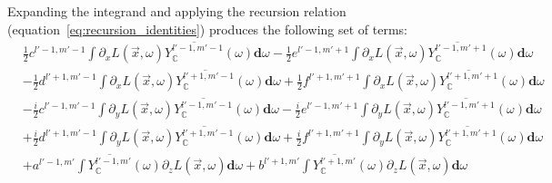 \documentclass[10pt]{scrartcl}
\begin{document}
Expanding the integrand and applying the recursion relation (equation~\ref{eq:recursion_identities}) produces the following set of terms:
\begin{align*}
&
\frac{1}{2}c^{{l'-1,m'-1}}\int{\partial_xL\left (\vec{x} ,\omega \right )\overline{Y_{\mathbb{C}}^{l'-1, m'-1}}(\omega )\mathbf{d}\omega}
-\frac{1}{2}e^{{l'-1,m'+1}}\int{\partial_xL\left (\vec{x} ,\omega \right )\overline{Y_{\mathbb{C}}^{l'-1, m'+1}}(\omega )\mathbf{d}\omega}
\\&
-\frac{1}{2}d^{{l'+1,m'-1}}\int{\partial_xL\left (\vec{x} ,\omega \right )\overline{Y_{\mathbb{C}}^{l'+1, m'-1}}(\omega )\mathbf{d}\omega}
+\frac{1}{2}f^{{l'+1,m'+1}}\int{\partial_xL\left (\vec{x} ,\omega \right )\overline{Y_{\mathbb{C}}^{l'+1, m'+1}}(\omega )\mathbf{d}\omega}
\\&
-\frac{i}{2}c^{{l'-1,m'-1}}\int{\partial_yL\left (\vec{x} ,\omega \right )\overline{Y_{\mathbb{C}}^{l'-1, m'-1}}(\omega )\mathbf{d}\omega}
-\frac{i}{2}e^{{l'-1,m'+1}}\int{\partial_yL\left (\vec{x} ,\omega \right )\overline{Y_{\mathbb{C}}^{l'-1, m'+1}}(\omega )\mathbf{d}\omega}
\\&
+\frac{i}{2}d^{{l'+1,m'-1}}\int{\partial_yL\left (\vec{x} ,\omega \right )\overline{Y_{\mathbb{C}}^{l'+1, m'-1}}(\omega )\mathbf{d}\omega}
+\frac{i}{2}f^{{l'+1,m'+1}}\int{\partial_yL\left (\vec{x} ,\omega \right )\overline{Y_{\mathbb{C}}^{l'+1, m'+1}}(\omega )\mathbf{d}\omega}
\\&
+a^{{l'-1,m'}}\int{\overline{Y_{\mathbb{C}}^{l'-1, m'}}(\omega )\partial_zL\left (\vec{x} ,\omega \right )\mathbf{d}\omega}
+b^{{l'+1,m'}}\int{\overline{Y_{\mathbb{C}}^{l'+1, m'}}(\omega )\partial_zL\left (\vec{x} ,\omega \right )\mathbf{d}\omega}
\end{align*}
\end{document}
